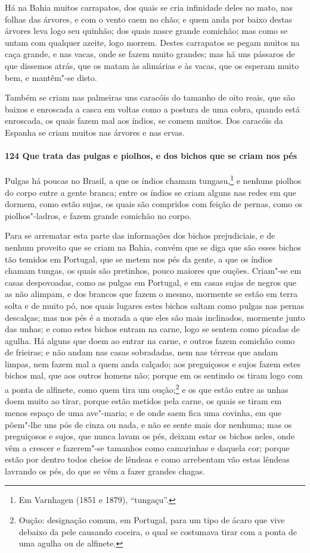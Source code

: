\begin{linenumbers}
Há na Bahia muitos carrapatos, dos quais se cria infinidade deles no mato, nas folhas das
árvores, e com o vento caem no chão; e quem anda por baixo destas árvores leva logo seu
quinhão; dos quais nasce grande comichão; mas como se untam com qualquer azeite, logo
morrem. Destes carrapatos se pegam muitos na caça grande, e nas vacas, onde se fazem muito
grandes; mas há uns pássaros de que dissemos atrás, que os matam às alimárias e às vacas,
que os esperam muito bem, e mantêm"-se disto.

Também se criam nas palmeiras uns caracóis do tamanho de oito reais, que são baixos e
enroscada a casca em voltas como a postura de uma cobra, quando está enroscada, os quais
fazem mal aos índios, se comem muitos. Dos caracóis da Espanha se criam muitos nas árvores
e nas ervas.

\paragraph{124 Que trata das pulgas e piolhos, e dos bichos que se criam nos pés}\quad
Pulgas há poucas no Brasil, a que os índios chamam tungasu,\footnote{ Em Varnhagen (1851 e
1879), ``tungaçu''.} e nenhuns piolhos do corpo entre a gente branca; entre os índios se
criam alguns nas redes em que dormem, como estão sujas, os quais são compridos com feição
de pernas, como os piolhos"-ladros, e fazem grande comichão no corpo.

Para se arrematar esta parte das informações dos bichos prejudiciais, e de nenhum proveito
que se criam na Bahia, convém que se diga que são esses bichos tão temidos em Portugal,
que se metem nos pés da gente, a que os índios chamam tungas, os quais são pretinhos,
pouco maiores que ouções. Criam"-se em casas despovoadas, como as pulgas em Portugal, e em
casas sujas de negros que as não alimpam, e dos brancos que fazem o mesmo, mormente se
estão em terra solta e de muito pó, nos quais lugares estes bichos saltam como pulgas nas
pernas descalças; mas nos pés é a morada a que eles são mais inclinados, mormente junto
das unhas; e como estes bichos entram na carne, logo se sentem como picadas de agulha. Há
alguns que doem ao entrar na carne, e outros fazem comichão como de frieiras; e não andam
nas casas sobradadas, nem nas térreas que andam limpas, nem fazem mal a quem anda calçado;
aos preguiçosos e sujos fazem estes bichos mal, que aos outros homens não; porque em os
sentindo os tiram logo com a ponta de alfinete, como quem tira um oução;\footnote{ Oução:
designação comum, em Portugal, para um tipo de ácaro que vive debaixo da pele causando
coceira, o qual se costumava tirar com a ponta de uma agulha ou de alfinete.} e os que
estão entre as unhas doem muito ao tirar, porque estão metidos pela carne, os quais se
tiram em menos espaço de uma ave"-maria; e de onde saem fica uma covinha, em que põem"-lhe
uns pós de cinza ou nada, e não se sente mais dor nenhuma; mas os preguiçosos e sujos, que
nunca lavam os pés, deixam estar os bichos neles, onde vêm a crescer e fazerem"-se tamanhos
como camarinhas e daquela cor; porque estão por dentro todos cheios de lêndeas e como
arrebentam vão estas lêndeas lavrando os pés, do que se vêm a fazer grandes chagas.


\end{linenumbers}
